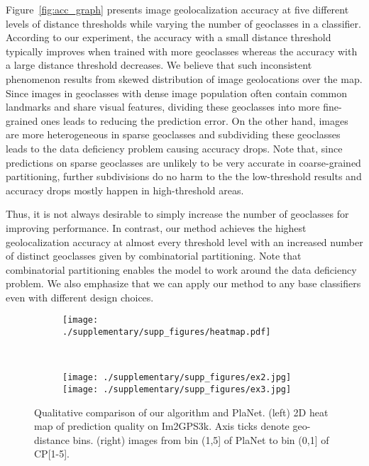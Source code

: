 \documentclass[runningheads]{llncs}
\begin{document}
\begin{appendix}
Figure~\ref{fig:acc_graph} presents image geolocalization accuracy at five different levels of distance thresholds while varying the number of geoclasses in a classifier. According to our experiment, the accuracy with a small distance threshold typically improves when trained with more geoclasses whereas the accuracy with a large distance threshold decreases.
We believe that such inconsistent phenomenon results from skewed distribution of image geolocations over the map.
Since images in geoclasses with dense image population often contain common landmarks and share visual features,
dividing these geoclasses into more fine-grained ones leads to reducing the prediction error.
On the other hand, images are more heterogeneous in sparse geoclasses and subdividing these geoclasses leads to the data deficiency problem causing accuracy drops.
Note that, since predictions on sparse geoclasses are unlikely to be very accurate in coarse-grained partitioning, further subdivisions do no harm to the the low-threshold results and accuracy drops mostly happen in high-threshold areas.


Thus, it is not always desirable to simply increase the number of geoclasses for improving performance.
In contrast, our method achieves the highest geolocalization accuracy at almost every threshold level with an increased number of distinct geoclasses given by combinatorial partitioning.
Note that combinatorial partitioning enables the model to work around the data deficiency problem.
We also emphasize that we can apply our method to any base classifiers even with different design choices.



\begin{figure}[t]
    \centering
    \begin{subfigure}[m]{0.45\linewidth}
    \texttt{[image: ./supplementary/supp\_figures/heatmap.pdf]}
    \end{subfigure}~~~~
    \begin{subfigure}[m]{0.42\linewidth}
\texttt{[image: ./supplementary/supp\_figures/ex2.jpg]}
    \texttt{[image: ./supplementary/supp\_figures/ex3.jpg]}
    \end{subfigure}
    \vspace{-0.4cm}
    \caption{ \small
    Qualitative comparison of our algorithm and PlaNet. (left) 2D heat map of prediction quality on Im2GPS3k.
    Axis ticks denote geo-distance bins.
(right) images from bin (1,5] of PlaNet to bin (0,1] of CP[1-5].
    }
    \label{fig:heatmap}
    \vspace{-0.6cm}
\end{figure}


\end{appendix}
\end{document}
